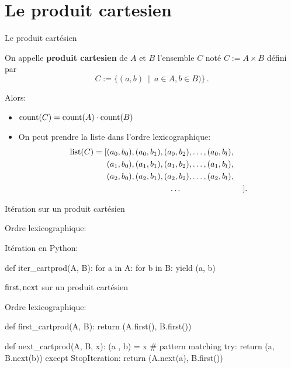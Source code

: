 \documentclass{beamer}
\begin{document}
\section{Le produit cartesien}
\begin{frame}{Le produit cartésien}

  \begin{definition}
    On appelle \textbf{produit cartesien} de $A$ et $B$ l'ensemble $C$ noté 
    $C:=A\times B$ défini par
    $$C := \{(a,b)\ \mid\ a\in A, b\in B)\}\,.$$
  \end{definition}
  \pause\bigskip

  Alors:
  \begin{itemize}
  \item $\operatorname{count}(C) = \operatorname{count}(A)\cdot\operatorname{count}(B)$
  \item On peut prendre la liste dans l'ordre lexicographique:
    \begin{align*}
      \operatorname{list}(C) = [&(a_0, b_0), (a_0, b_1), (a_0, b_2),\dots, (a_0, b_l),\\
                  &(a_1, b_0), (a_1, b_1), (a_1, b_2),\dots, (a_1, b_l),\\
                  &(a_2, b_0), (a_2, b_1), (a_2, b_2),\dots, (a_2, b_l),\\
                  &\hspace{2.7cm}\dots\hspace{2.7cm}].
    \end{align*}
  \end{itemize}
\end{frame}

\begin{frame}[fragile]{Itération sur un produit cartésien}

  Ordre lexicographique:
  \bigskip

  Itération en Python:
\begin{listing}{1}
    def iter_cartprod(A, B):
        for a in A:
            for b in B:
                yield (a, b)
\end{listing}
\end{frame}

\begin{frame}[fragile]{$\operatorname{first}, \operatorname{next}$ sur un produit cartésien}

  Ordre lexicographique:
  \bigskip
\begin{listing}{1}
    def first_cartprod(A, B):
        return (A.first(), B.first())

    def next_cartprod(A, B, x):
        (a , b) = x      # pattern matching
        try:
           return (a, B.next(b))
        except StopIteration:
           return (A.next(a), B.first())
\end{listing}
\end{frame}
\end{document}
